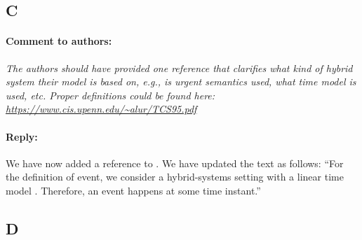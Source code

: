 \documentclass[10pt,final,a4paper,oneside,onecolumn]{article}
\newcommand{\toauthor}{\paragraph*{Comment to authors:} \itshape}
\newcommand{\fromauthor}{\paragraph*{Reply:} \normalfont}
\newcommand{\toauthornew}{\paragraph*{Comment to authors:} \itshape}
\newcommand{\fromauthornew}{\paragraph*{Reply:} \normalfont}
\newcommand{\cstart}{\cbstart\color{red}}
\newcommand{\cend}{\cbend\color{black}}
\begin{document}
\subsection*{C}

%

\toauthornew The authors should have provided one reference that clarifies what kind of hybrid system their model is based on, e.g., is urgent semantics used, what time model is used, etc. Proper definitions could be found here: \url{https://www.cis.upenn.edu/~alur/TCS95.pdf}

\fromauthornew 
We have now added a reference to \autocite{alur1994theory}. We have updated the text as follows:
``\cstart For the definition of event, we consider a hybrid-systems setting with a linear time model \autocite{alur1994theory}. Therefore, an event happens at some time instant.\cend''


\subsection*{D}

%
\end{document}

